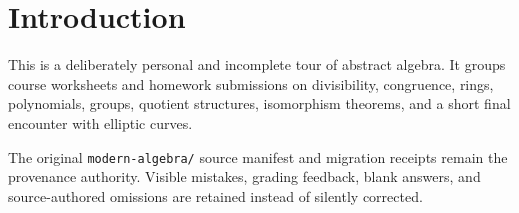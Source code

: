 \chapter{Introduction}

This is a deliberately personal and incomplete tour of abstract algebra. It groups course worksheets and homework submissions on divisibility, congruence, rings, polynomials, groups, quotient structures, isomorphism theorems, and a short final encounter with elliptic curves.

The original \texttt{modern-algebra/} source manifest and migration receipts remain the provenance authority. Visible mistakes, grading feedback, blank answers, and source-authored omissions are retained instead of silently corrected.
